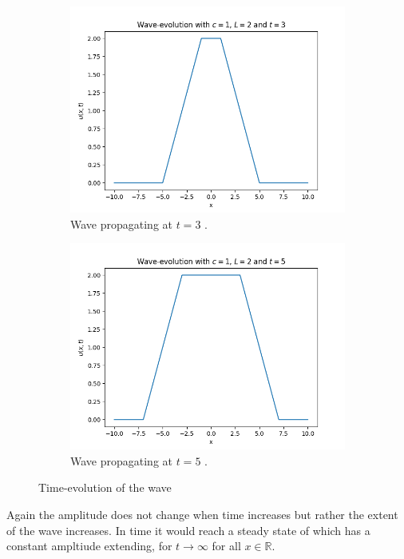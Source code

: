 \documentclass{article}
\begin{document}
\begin{figure}[H]
    \centering
    \begin{subfigure}[b]{0.45\textwidth}
        \includegraphics[scale = 0.4]{task3_2.png}
        \caption{Wave propagating at $t = 3$ .}
        \label{fig:3_2_1}
    \end{subfigure}
    \hfill
    \begin{subfigure}[b]{0.45\textwidth}
        \includegraphics[scale = 0.4]{task3_2_2.png}
        \caption{Wave propagating at $t = 5$ .}
        \label{fig:3_2_2}
    \end{subfigure}
    \caption{Time-evolution of the wave}
\end{figure}\noindent
Again the amplitude does not change when time increases but rather the extent of the wave increases. In time it would reach a steady state of which has a constant ampltiude extending, for $t\to\infty$ for all $x\in\mathbb{R}$.
\end{document}
